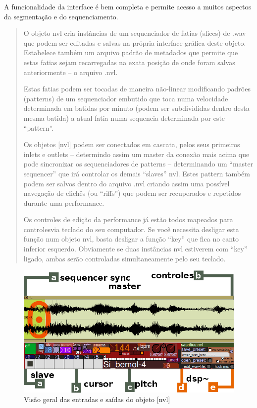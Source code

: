 \documentclass[draft]{ppgmus}
\begin{document}
A funcionalidade da interface é bem completa e permite acesso a muitos aspectos da segmentação e do
sequenciamento.

\begin{quote}
 O objeto nvl cria instâncias de um sequenciador de fatias (slices) de .wav que podem ser editadas e salvas na 
própria interface gráfica deste objeto.
Estabelece também um arquivo padrão de metadados que permite que estas fatias sejam recarregadas na 
exata posição de onde foram salvas anteriormente – o arquivo .nvl.

Estas fatias podem ser tocadas de maneira não-linear modificando padrões (patterns) de um sequenciador 
embutido que toca numa velocidade determinada em batidas por minuto (podem ser subdivididas dentro desta 
mesma batida) a atual fatia numa sequencia determinada por este “pattern”.

Os objetos [nvl] podem ser conectados em cascata, pelos seus primeiros inlets e outlets – determindo 
assim um master da conexão mais acima que pode sincronizar os sequenciadores de patterns – determinando um 
“master sequencer” que irá controlar os demais “slaves” nvl.
Estes pattern também podem ser salvos dentro do arquivo .nvl criando assim uma possível navegação de clichês 
(ou “riffs”) que podem ser recuperados e repetidos durante uma performance.

Os controles de edição da performance já estão todos mapeados para controlesvia teclado do seu computador. 
Se você necessita desligar esta função num objeto nvl, basta desligar a função “key” que fica no canto inferior 
esquerdo. Obviamente se duas instâncias nvl estiverem com “key” ligado, ambas serão controladas simultaneamente 
pelo seu teclado. \cite{navalha}
\end{quote} 

\begin{figure}
\includegraphics[scale=.6]{nvl1}
\caption{Visão geral das entradas e saídas do objeto [nvl]}
\label{nvl1}
\end{figure}
\end{document}
